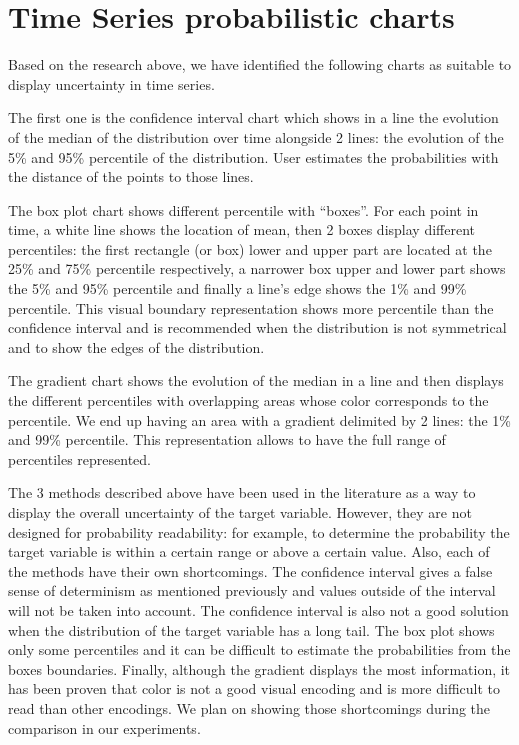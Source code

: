 \documentclass[a4paper,3p,sort&compress]{elsarticle}
\begin{document}
\section{Time Series probabilistic charts}  
\label{sec:time_series}

Based on the research above, we have identified the following charts as suitable to display 
uncertainty in time series.

The first one is the confidence interval chart  which shows in a line the evolution of the 
median of the distribution
 over time alongside 2 lines: the evolution of the 5\% and 95\% percentile of the distribution. 
 User estimates the probabilities with the distance of the points to those lines.

The box plot chart shows different percentile with “boxes”. For each point in time, a white 
line shows the location of mean, then 2 boxes display different percentiles: the
first rectangle (or box) lower and upper part are located 
at the 25\% and 75\% percentile respectively, a narrower box upper and lower part shows 
the 5\% and 95\% percentile and finally a line’s edge shows the 1\% and 99\% percentile. 
This visual boundary representation shows more percentile than the confidence interval and 
is recommended when the distribution is not symmetrical and to show the edges of the distribution.

The gradient chart shows the evolution of the median in a line and then displays the different percentiles
with overlapping areas whose color corresponds to the percentile. We end up having an area with a gradient 
delimited by 2 lines: the 1\% and 99\% percentile. This representation allows to have the
 full range of percentiles represented.

The 3 methods described above have been used in the literature as a way to display the overall uncertainty 
of the target variable. However, they are not designed for probability readability: for example, to determine 
the probability the target variable is within a certain range or above a certain value. Also,
each of the methods have their own shortcomings. The confidence interval gives a false sense of determinism as mentioned previously
and values outside of the interval will not be taken into account. The confidence interval is also not a good solution 
when the distribution of the target variable has a long tail. The box plot shows only some percentiles and it can be difficult to 
estimate the probabilities from the boxes boundaries. Finally, although the gradient displays the most information, it has been 
proven that color is not 
a good visual encoding and is more difficult to read than other encodings. We plan on showing those shortcomings during the comparison in our experiments.
\end{document}
